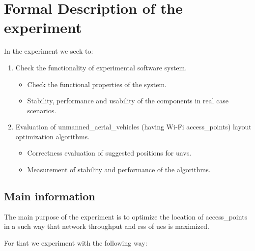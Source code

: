 \section{Formal Description of the
experiment}\label{formal-description-of-the-experiment}

In the experiment we seek to:

\begin{enumerate}
\def\labelenumi{\arabic{enumi}.}
\tightlist
\item
  Check the functionality of experimental software system.
  
  \begin{itemize}
  	\tightlist
  	\item
  	Check the functional properties of the system.
  	\item
  	Stability, performance and usability of the components in real case
  	scenarios.
  \end{itemize}

\item
  Evaluation of \glspl{unmanned_aerial_vehicle} (having Wi-Fi \glspl{access_point}) layout
  optimization algorithms.
  
  \begin{itemize}
  	\tightlist
  	\item
  	Correctness evaluation of suggested positions for \glspl{uav}.
  	\item
  	Measurement of stability and performance of the	algorithms.
  \end{itemize}
  
\end{enumerate}


\subsection{Main information}\label{main-information}

The main purpose of the experiment is to optimize the location of \glspl{access_point} in 
a such way that network throughput and \gls{rss} of \glspl{ue} is maximized.

For that we experiment with the following way:

